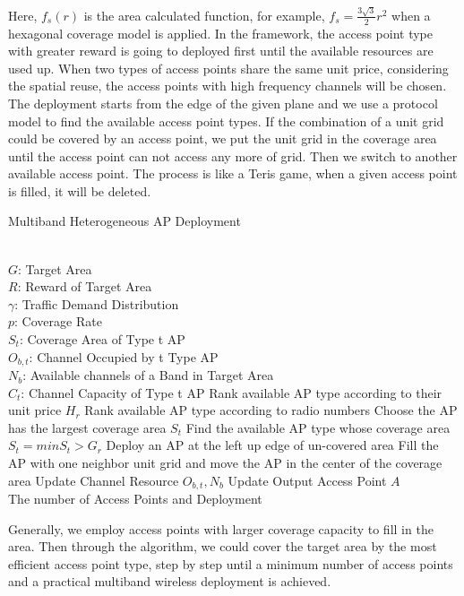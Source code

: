 Here, $f_s(r)$ is the area calculated function, for example, $f_s = \frac{3\sqrt{3}}{2}r^2$ when a 
hexagonal coverage model is applied. In the framework, the access point type with greater reward 
is going to deployed first until the available resources are used up. When two types of access points
share the same unit price, considering the spatial reuse, the access points with high frequency channels
will be chosen. The deployment starts from the edge of the given plane and we use a protocol model
to find the available access point types. If the combination of a unit grid could be covered by an 
access point, we put the unit grid in the coverage area until the access point can not access any 
more of grid. Then we switch to another available access point. The process is like a Teris game, 
when a given access point is filled, it will be deleted.
\begin{algorithm}
\caption{Multiband Heterogeneous AP Deployment}
\label{alg:gls}
\begin{algorithmic}[1]
\REQUIRE  ~~\\
$G$: Target Area \\
$R$: Reward of Target Area \\
$\gamma$: Traffic Demand Distribution\\
$p$: Coverage Rate\\
$S_t$: Coverage Area of Type t AP \\
$O_{b,t}$: Channel Occupied by t Type AP\\
$N_b$: Available channels of a Band in Target Area\\
$C_t$: Channel Capacity of Type t AP
\STATE Rank available AP type according to their unit price $H_r$
\STATE Rank available AP type according to radio numbers
\STATE Choose the AP has the largest coverage area $S_t$
\ELSE 
\STATE Find the available AP type whose coverage area $S_t=min{S_t>G_r}$
\ENDIF
\STATE Deploy an AP at the left up edge of un-covered area
\STATE Fill the AP with one neighbor unit grid and move the AP in the center of the coverage area
\STATE Update Channel Resource $O_{b,t}, N_b$
\STATE Update Output Access Point $A$
\ENDWHILE
\ENSURE ~~\\
The number of Access Points and Deployment\\
\end{algorithmic}
\end{algorithm}

Generally, we employ access points with larger coverage capacity to fill in the area. Then 
through the algorithm, we could cover the target area by the most efficient access point type,
step by step until a  minimum number of access points and a practical multiband wireless 
deployment is achieved.
